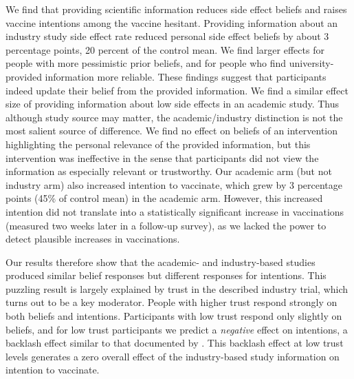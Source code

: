We find that providing scientific information reduces side effect beliefs and raises 
vaccine intentions among the vaccine hesitant. Providing information about an industry study 
side effect rate reduced personal side effect
beliefs by about 3 percentage points, 20 percent of the control mean. We find 
larger effects for people with more pessimistic prior beliefs, and for people who find university-provided information more reliable.
These findings suggest that participants indeed update their belief from the provided information.
We find a similar effect size of providing information about low side effects in an academic study.
Thus although study source may matter, the academic/industry distinction is not the most salient source of difference. 
We find no effect on beliefs of an intervention highlighting the personal relevance of the provided information, but 
this intervention was ineffective in the sense that participants did not view the information
as especially relevant or trustworthy. Our academic arm (but not industry arm) also increased intention 
to vaccinate, which grew by 3 percentage points (45\% of control mean) in the academic arm. 
However, this increased intention did not translate into a statistically significant increase in vaccinations 
(measured two weeks later in a follow-up survey),  as we lacked the power to detect plausible increases in vaccinations. 

Our results therefore show that the academic- and industry-based studies produced similar belief responses but different 
responses for intentions. This puzzling result is largely explained by trust in the described industry trial, which turns
out to be a key moderator. People with higher trust respond strongly on both beliefs and intentions. Participants with 
low trust respond only slightly on beliefs, and for low trust participants we predict a {\em negative} effect on intentions, 
a backlash effect similar to that documented by \citet{nyhan2014effective}.  This backlash effect at low trust levels generates a zero 
overall effect of the industry-based study information on intention to vaccinate. 

